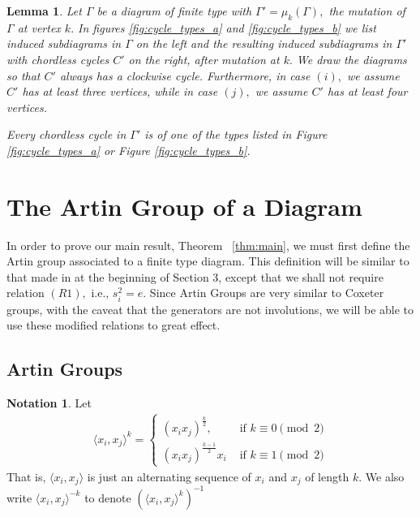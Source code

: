 \documentclass[11pt]{amsart}
\newtheorem{lem}[thm]{Lemma}
\theoremstyle{definition}
\newtheorem{note}[thm]{Notation}
\begin{document}
\begin{lem}\label{lem:chordless_cycles}
\cite[Lemma 2.5]{BM13} 
Let $\Gamma$ be a diagram of finite type with $\Gamma' = \mu_k(\Gamma),$ the mutation of $\Gamma$ at vertex $k.$ In figures \ref{fig:cycle_types_a} and \ref{fig:cycle_types_b} we list induced subdiagrams in $\Gamma$ on the left and the resulting induced subdiagrams in $\Gamma'$ with chordless cycles $C'$ on the right, after mutation at $k.$ We draw the diagrams so that $C'$ always has a clockwise cycle. Furthermore, in case $(i),$ we assume $C'$ has at least three vertices, while in case $(j),$ we assume $C'$ has at least four vertices. 

Every chordless cycle in $\Gamma'$ is of one of the types listed in Figure \ref{fig:cycle_types_a} or Figure \ref{fig:cycle_types_b}.
\end{lem}


\section{The Artin Group of a Diagram}
\label{sec:defn_artingroup}

In order to prove our main result, Theorem ~\ref{thm:main}, we must first define the Artin group associated to a finite type diagram. This definition will be similar to that made in \cite{BM13} at the beginning of Section 3, except that we shall not require relation $(R1),$ i.e., $s_i^2 = e.$ Since Artin Groups are very similar to Coxeter groups, with the caveat that the generators are not involutions, we will be able to use these modified relations to great effect.

\subsection{Artin Groups}

\begin{note}
Let
\begin{align*}
\langle x_i,x_j \rangle ^k = \begin{cases}
(x_ix_j)^{\frac{k}{2}}, &\text{ if }k \equiv 0 \pmod 2\\
(x_ix_j)^{\frac{k-1}{2}}x_i &\text{ if } k \equiv 1 \pmod 2
\end{cases}
\end{align*}
That is, $\langle x_i,x_j \rangle$ is just an alternating sequence of $x_i$ and $x_j$ of length $k$.  We also write $\langle x_i,x_j\rangle^{-k}$ to denote $\left(\langle x_i,x_j\rangle^k\right)^{-1}$
\end{note}
\end{document}
